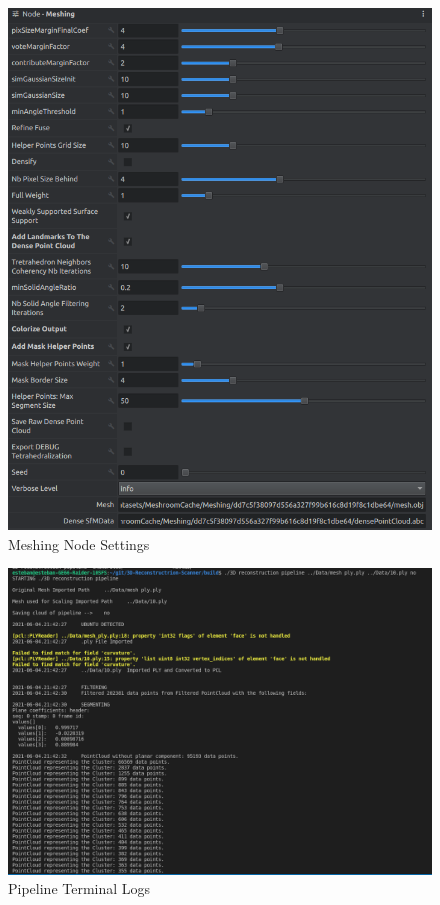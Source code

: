 \documentclass[12pt]{report}
\begin{document}
\begin{figure}[H]%
  \centering
  \includegraphics[width=1\textwidth]{meshing_2.png}
\caption{Meshing Node Settings}
\label{fig:meshing2_big}
\end{figure}

\begin{figure}[H]%
  \centering
  \includegraphics[width=1\textwidth]{log1.png}
\caption{Pipeline Terminal Logs}
\label{fig:log1}
\end{figure}
\end{document}
